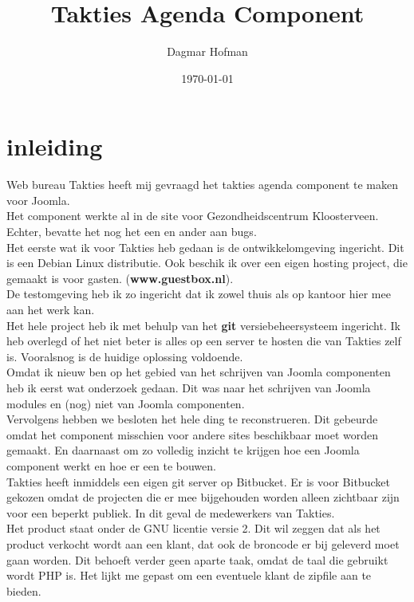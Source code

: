 \documentclass{article}
\title{ Takties Agenda Component  }
\author{ Dagmar Hofman  }
\date{ \today }
\begin{document}
\maketitle
{}

\newpage
\tableofcontents

\newpage
\section{inleiding}

Web bureau Takties heeft mij gevraagd het takties agenda component te maken voor Joomla. \\
Het component werkte al in de site voor Gezondheidscentrum Kloosterveen. Echter, bevatte het nog het een en ander aan bugs. \\
Het eerste wat ik voor Takties heb gedaan is de ontwikkelomgeving ingericht. Dit is een Debian Linux distributie. Ook beschik ik over een eigen hosting project, die gemaakt is voor gasten. (\textbf{www.guestbox.nl}). \\
De testomgeving heb ik zo ingericht dat ik zowel thuis als op kantoor hier mee aan het werk kan. \\
Het hele project heb ik met behulp van het \textbf{git} versiebeheersysteem ingericht. Ik heb overlegd of het niet beter is alles op een server te hosten die van Takties zelf is. Vooralsnog is de huidige oplossing voldoende. \\
Omdat ik nieuw ben op het gebied van het schrijven van Joomla componenten heb ik eerst wat onderzoek gedaan. Dit was naar het schrijven van Joomla modules en (nog) niet van Joomla componenten. \\
Vervolgens hebben we besloten het hele ding te reconstrueren. Dit gebeurde omdat het component misschien voor andere sites beschikbaar moet worden gemaakt. En daarnaast om zo volledig inzicht te krijgen hoe een Joomla component werkt en hoe er een te bouwen. \\
Takties heeft inmiddels een eigen git server op Bitbucket. Er is voor Bitbucket gekozen omdat de projecten die er mee bijgehouden worden alleen zichtbaar zijn voor een beperkt publiek. In dit geval de medewerkers van Takties.\\
Het product staat onder de GNU licentie versie 2. Dit wil zeggen dat als het product verkocht wordt aan een klant, dat ook de broncode er bij geleverd moet gaan worden. Dit behoeft verder geen aparte taak, omdat de taal die gebruikt wordt PHP is. Het lijkt me gepast om een eventuele klant de zipfile aan te bieden. \\
\end{document}

